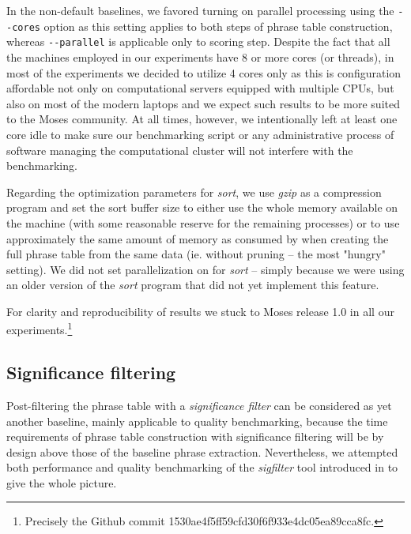 In the non-default baselines, we favored turning on parallel processing using the \verb|--cores|
option as this setting applies to both steps of phrase table construction, whereas
\verb|--parallel| is applicable only to scoring step.
Despite the fact that all the machines employed in our experiments have 8 or more cores (or threads),
in most of the experiments we decided to utilize 4 cores only as this is configuration
affordable not only on computational servers equipped with multiple CPUs, but also on most
of the modern laptops and we expect such results to be more suited to the Moses community.
At all times, however, we intentionally left at least one core idle to make sure our
benchmarking script or any administrative process of software managing the computational
cluster will not interfere with the benchmarking.

Regarding the optimization parameters for \emph{sort}, we use \emph{gzip} as a compression
program and set the sort buffer size to either use the whole memory available on the machine
(with some reasonable reserve for the remaining processes) or to use approximately the same
amount of memory as consumed by \eppex{} when creating the full phrase table from
the same data (ie. without pruning -- the most "hungry" setting).
We did not set parallelization on for \emph{sort} -- simply because we were using an older
version of the \emph{sort} program that did not yet implement this feature.

For clarity and reproducibility of results we stuck to Moses release 1.0 in all our 
experiments.\footnote{Precisely the Github commit 1530ae4f5ff59cfd30f6f933e4dc05ea89cca8fc.}

\subsection{Significance filtering}

Post-filtering the phrase table with a \emph{significance filter} can be considered as yet
another baseline, mainly applicable to quality benchmarking, because the time requirements
of phrase table construction with significance filtering will be by design above those of
the baseline phrase extraction.
Nevertheless, we attempted both performance and quality benchmarking of the \emph{sigfilter}
tool introduced in  to give the whole picture.

